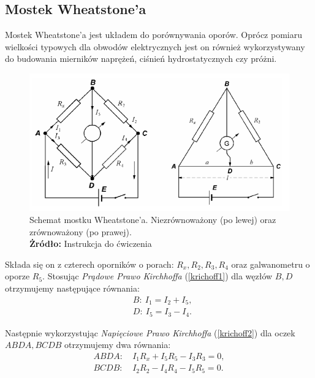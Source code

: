 \documentclass[12pt,a4paper]{article}
\numberwithin{equation}{section}
\newcommand*{\captionsource}[2]{%
	\caption[{#1}]{%
		#1%
		\\\hspace{\linewidth}%
		\textbf{Żródło:} #2%
	}%
}
\begin{document}
\subsection{Mostek Wheatstone'a}

Mostek Wheatstone'a jest układem do porównywania oporów. Oprócz pomiaru wielkości typowych dla obwodów elektrycznych jest on również wykorzystywany do budowania mierników naprężeń, ciśnień hydrostatycznych czy próżni. 

\begin{figure}[!htb]
	\includegraphics[width=1\textwidth]{img/mostek.png} 
	\captionsource{Schemat mostku Wheatstone'a. Niezrównoważony (po lewej) oraz zrównoważony (po prawej).}{Instrukcja do ćwiczenia}
	\label{fig:img1}
\end{figure}


Składa się on z czterech oporników o porach: $R_x, R_2, R_3, R_4$ oraz galwanometru o oporze $R_5$. Stosując \emph{Prądowe Prawo Kirchhoffa} (\ref{krichoff1}) dla węzłów $B, D$ otrzymujemy następujące równania:
\begin{equation}
	\begin{split}
	&B:~I_1 = I_2 + I_5, \\
	&D:~I_5 = I_3 - I_4.
	\end{split}
	\label{eq:e1}
\end{equation}

\pagebreak
Następnie wykorzystując \emph{Napięciowe Prawo Kirchhoffa} (\ref{krichoff2}) dla oczek $ABDA, BCDB$ otrzymujemy dwa równania:
\begin{equation}
	\begin{split}
	ABDA:&~I_1 R_x + I_5 R_5 - I_3 R_3 = 0, \\
	BCDB:&~I_2 R_2 - I_4 R_4 - I_5 R_5 = 0.
	\end{split}
	\label{eq:e2}
\end{equation}
\end{document}
